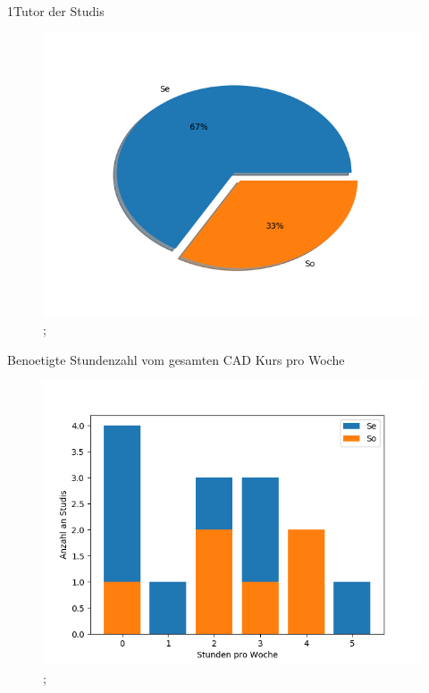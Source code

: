 \documentclass[10pt]{beamer}
\begin{document}
\begin{frame}[fragile]{1Tutor der Studis} 
 \begin{figure}
 \includegraphics[width= 0.9\linewidth]{./PDFcreater/Plots/Nx/1Tutor+der+Studis.png};
 \end{figure}
 \end{frame}
\begin{frame}[fragile]{Benoetigte Stundenzahl vom gesamten CAD Kurs pro Woche} 
 \begin{figure}
 \includegraphics[width= 0.9\linewidth]{./PDFcreater/Plots/Nx/Benoetigte+Stundenzahl+vom+gesamten+CAD+Kurs+pro+Woche.png};
 \end{figure}
 \end{frame}
\end{document}
